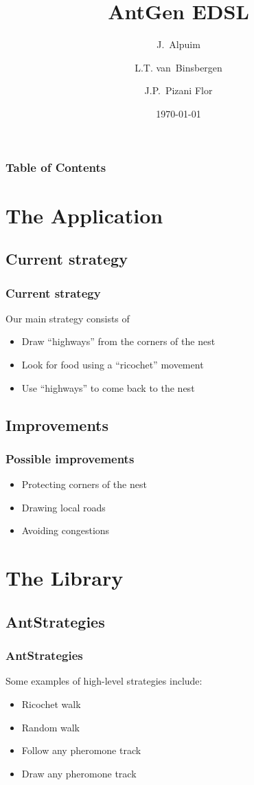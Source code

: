 \documentclass{beamer}
\title[Ants]{AntGen EDSL}
\date{\today}
\author[Alpuim, Binsbergen, Pizani Flor]
{
    J.~Alpuim
    \and L.T. van~Binsbergen
    \and J.P.~Pizani Flor
}
\institute[Utrecht University]
{
    Department of Information and Computing Sciences,
    Utrecht University
}
\begin{document}
    \begin{frame}
        \titlepage
    \end{frame}

    \begin{frame}
        \frametitle{Table of Contents}
        \tableofcontents
    \end{frame}

    \section{The Application}
        \subsection{Current strategy}
        \begin{frame}
            \frametitle{Current strategy}
            Our main strategy consists of
            \begin{itemize}
                \item Draw ``highways'' from the corners of the nest
                \item Look for food using a ``ricochet'' movement
                \item Use ``highways'' to come back to the nest
            \end{itemize}
        \end{frame}

        \subsection{Improvements}
        \begin{frame}
            \frametitle{Possible improvements}
            \begin{itemize}
                \item Protecting corners of the nest
                \item Drawing local roads
                \item Avoiding congestions
            \end{itemize}
        \end{frame}


    \section{The Library}
        \subsection{AntStrategies}
        \begin{frame}
        \frametitle{AntStrategies}
            Some examples of high-level strategies include:
            \begin{itemize}
                \item Ricochet walk
                \item Random walk
                \item Follow any pheromone track
                \item Draw any pheromone track
            \end{itemize}
        \end{frame}
\end{document}
